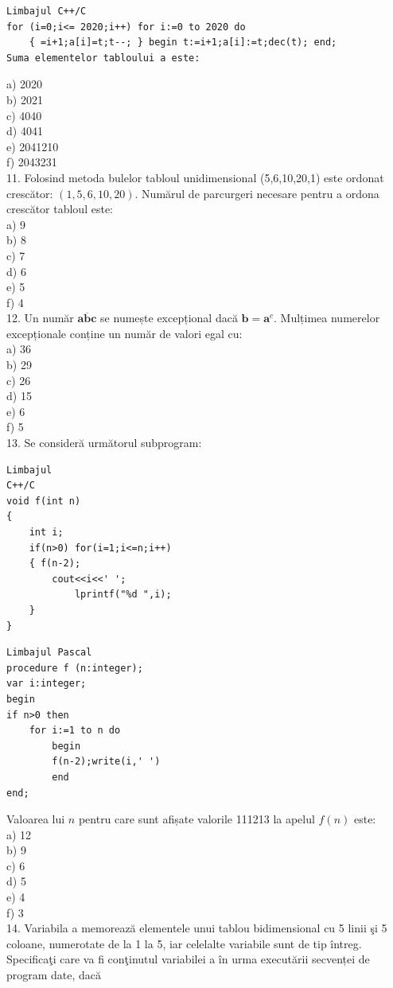 \documentclass[10pt]{article}
\begin{document}
\begin{verbatim}
Limbajul C++/C
for (i=0;i<= 2020;i++) for i:=0 to 2020 do
    { =i+1;a[i]=t;t--; } begin t:=i+1;a[i]:=t;dec(t); end;
Suma elementelor tabloului a este:
\end{verbatim}

a) 2020\\
b) 2021\\
c) 4040\\
d) 4041\\
e) 2041210\\
f) 2043231\\
11. Folosind metoda bulelor tabloul unidimensional (5,6,10,20,1) este ordonat crescător: $(1,5,6,10,20)$. Numărul de parcurgeri necesare pentru a ordona crescător tabloul este:\\
a) 9\\
b) 8\\
c) 7\\
d) 6\\
e) 5\\
f) 4\\
12. Un număr $\overline{\mathbf{a b c}}$ se numește excepțional dacă $\mathbf{b}=\mathbf{a}^{c}$. Mulțimea numerelor excepționale conține un număr de valori egal cu:\\
a) 36\\
b) 29\\
c) 26\\
d) 15\\
e) 6\\
f) 5\\
13. Se consideră următorul subprogram:

\begin{verbatim}
Limbajul
C++/C
void f(int n)
{
    int i;
    if(n>0) for(i=1;i<=n;i++)
    { f(n-2);
        cout<<i<<' ';
            lprintf("%d ",i);
    }
}
\end{verbatim}

\begin{verbatim}
Limbajul Pascal
procedure f (n:integer);
var i:integer;
begin
if n>0 then
    for i:=1 to n do
        begin
        f(n-2);write(i,' ')
        end
end;
\end{verbatim}

Valoarea lui $n$ pentru care sunt afișate valorile 111213 la apelul $f(n)$ este:\\
a) 12\\
b) 9\\
c) 6\\
d) 5\\
e) 4\\
f) 3\\
14. Variabila a memorează elementele unui tablou bidimensional cu 5 linii şi 5 coloane, numerotate de la 1 la 5, iar celelalte variabile sunt de tip întreg. Specificaţi care va fi conţinutul variabilei a în urma executării secvenței de program date, dacă
\end{document}
